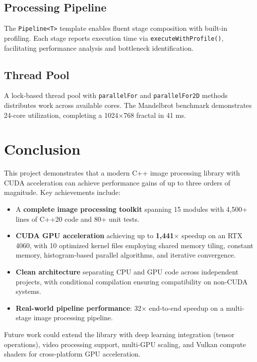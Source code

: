 \documentclass[9pt,a4paper,twocolumn,twoside]{rho-class/rho}
\begin{document}
    \subsection{Processing Pipeline}

        The \texttt{Pipeline<T>} template enables fluent stage composition with built-in profiling. Each stage reports execution time via \texttt{executeWithProfile()}, facilitating performance analysis and bottleneck identification.

    \subsection{Thread Pool}

        A lock-based thread pool with \texttt{parallelFor} and \texttt{parallelFor2D} methods distributes work across available cores. The Mandelbrot benchmark demonstrates 24-core utilization, completing a 1024$\times$768 fractal in 41 ms.

\section{Conclusion}

    This project demonstrates that a modern C++ image processing library with CUDA acceleration can achieve performance gains of up to three orders of magnitude. Key achievements include:

    \begin{itemize}
        \item A \textbf{complete image processing toolkit} spanning 15 modules with 4,500+ lines of C++20 code and 80+ unit tests.
        \item \textbf{CUDA GPU acceleration} achieving up to \textbf{1,441$\times$} speedup on an RTX 4060, with 10 optimized kernel files employing shared memory tiling, constant memory, histogram-based parallel algorithms, and iterative convergence.
        \item \textbf{Clean architecture} separating CPU and GPU code across independent projects, with conditional compilation ensuring compatibility on non-CUDA systems.
        \item \textbf{Real-world pipeline performance}: 32$\times$ end-to-end speedup on a multi-stage image processing pipeline.
    \end{itemize}

    Future work could extend the library with deep learning integration (tensor operations), video processing support, multi-GPU scaling, and Vulkan compute shaders for cross-platform GPU acceleration.


\printbibliography

\end{document}
